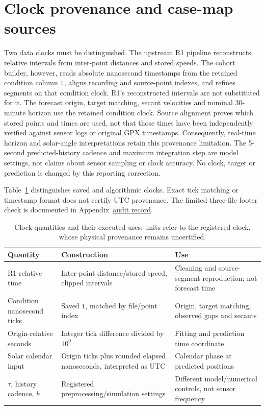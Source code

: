\section{Clock provenance and case-map sources}
\label{sec:clock-and-map-provenance}\hypertarget{sec:clock-and-map-provenance}{}
Two data clocks must be distinguished. The upstream R1 pipeline reconstructs
relative intervals from inter-point distances and stored speeds. The cohort builder,
however, reads absolute nanosecond timestamps from the retained condition
column \texttt{t}, aligns recording and source-point indexes, and refines
segments on that condition clock. R1's reconstructed intervals are not
substituted for it. The forecast origin, target matching, secant velocities
and nominal 30-minute horizon use the retained condition clock. Source
alignment proves which stored points and times are used, not that those
times have been independently verified against sensor logs or original GPX
timestamps. Consequently, real-time horizon and solar-angle interpretations
retain this provenance limitation. The 5-second predicted-history cadence
and maximum integration step are model settings, not claims about sensor
sampling or clock accuracy. No clock, target or prediction is changed by
this reporting correction.

Table~\ref{tab:clock-use} distinguishes saved and algorithmic clocks.
Exact tick matching or timestamp format does not certify UTC provenance.
The limited three-file footer check is documented in
Appendix~\href{audit-notes.pdf\#sec:source-reconciliation-details}{audit record}.

\begin{table}[htbp]
\centering\small
\caption{Clock quantities and their executed uses; units refer to the
registered clock, whose physical provenance remains uncertified.}
\label{tab:clock-use}\hypertarget{tab:clock-use}{}
\begin{tabular}{@{}p{.25\linewidth}p{.36\linewidth}p{.32\linewidth}@{}}
\toprule
Quantity & Construction & Use\\
\midrule
R1 relative time & Inter-point distance/stored speed, clipped intervals &
Cleaning and source-segment reproduction; not forecast time\\
Condition nanosecond ticks & Saved \texttt{t}, matched by file/point index &
Origin, target matching, observed gaps and secants\\
Origin-relative seconds & Integer tick difference divided by \(10^9\) &
Fitting and prediction time coordinate\\
Solar calendar input & Origin ticks plus rounded elapsed nanoseconds,
interpreted as UTC & Calendar phase at predicted positions\\
\(\tau\), history cadence, \(h\) & Registered preprocessing/simulation settings &
Different model/numerical controls, not sensor frequency\\
\bottomrule
\end{tabular}
\end{table}


